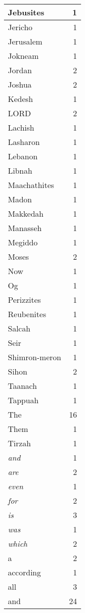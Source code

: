 \begin{center}
\begin{longtable}{l|r}
Jebusites & 1 \\ \hline
Jericho & 1 \\ \hline
Jerusalem & 1 \\ \hline
Jokneam & 1 \\ \hline
Jordan & 2 \\ \hline
Joshua & 2 \\ \hline
Kedesh & 1 \\ \hline
LORD & 2 \\ \hline
Lachish & 1 \\ \hline
Lasharon & 1 \\ \hline
Lebanon & 1 \\ \hline
Libnah & 1 \\ \hline
Maachathites & 1 \\ \hline
Madon & 1 \\ \hline
Makkedah & 1 \\ \hline
Manasseh & 1 \\ \hline
Megiddo & 1 \\ \hline
Moses & 2 \\ \hline
Now & 1 \\ \hline
Og & 1 \\ \hline
Perizzites & 1 \\ \hline
Reubenites & 1 \\ \hline
Salcah & 1 \\ \hline
Seir & 1 \\ \hline
Shimron-meron & 1 \\ \hline
Sihon & 2 \\ \hline
Taanach & 1 \\ \hline
Tappuah & 1 \\ \hline
The & 16 \\ \hline
Them & 1 \\ \hline
Tirzah & 1 \\ \hline
\emph{and} & 1 \\ \hline
\emph{are} & 2 \\ \hline
\emph{even} & 1 \\ \hline
\emph{for} & 2 \\ \hline
\emph{is} & 3 \\ \hline
\emph{was} & 1 \\ \hline
\emph{which} & 2 \\ \hline
a & 2 \\ \hline
according & 1 \\ \hline
all & 3 \\ \hline
and & 24 \\ \hline

\end{longtable}
\end{center}
